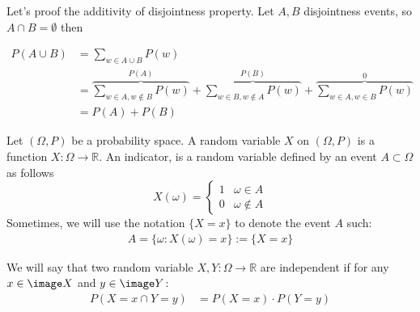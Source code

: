 \begin{example}
  Let's proof the additivity of disjointness property. Let $A,B$ disjointness events, so $A \cap B = \emptyset$ then 
  
  \begin{equation*}
    \begin{split}
      P(A\cup B) &= \sum_{w \in A \cup B}P(w) \\ 
      &= \overbrace{\sum_{w \in A, w \notin{B}}P(w)}^{P(A)} + \overbrace{\sum_{w \in B, w \notin A}P(w)}^{P(B)}  +\overbrace{ \sum_{w \in A, w \in  B}P(w) }^{ 0 } \\ 
      &= P(A) + P(B) 
    \end{split}
  \end{equation*}
\end{example}

\begin{definition}
  Let $(\Omega,P)$ be a probability space. A random variable $X$ on $(\Omega,P)$ is a function $X : \Omega \rightarrow \mathbb{R}$. An indicator, is a random variable defined by an event $A \subset \Omega$ as follows   
  \begin{equation*}
    X(\omega) = \begin{cases}
      1 & \omega \in A \\
      0 & \omega \notin A
    \end{cases}
  \end{equation*}
Sometimes, we will use the notation $\{ X = x \}$ to denote the event $A$ such: 
\begin{equation*}
  \begin{split}
    A = \{ \omega : X(\omega) = x \} := \{ X = x \} 
  \end{split}
\end{equation*}
\end{definition}
\begin{example}
\end{example}


\begin{definition}
  We will say that two random variable $X,Y : \Omega \rightarrow \mathbb{R}$  are independent if for any $x\in \image X$ and $y \in \image Y$:   
  \begin{equation*}
    \begin{split}
      P(X = x \cap Y = y) &= P(X = x) \cdot P (Y = y) %
    \end{split}
  \end{equation*}
\end{definition}

